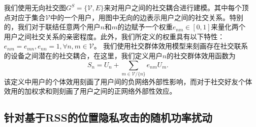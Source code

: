 我们使用无向社交图$G^S=\{\mathcal{V},E\}$来对用户之间的社交耦合进行建模。其中每个顶点对应于集合$\mathcal{V}$中的一个用户，用图中无向的边表示用户之间的社交关系。特别的，我们对于联结任意两个用户$n$和$m$的边赋予一个权重$e_{nm}\in [0,1]$来量化两个用户之间社交关系的亲密程度。此外，我们所定义的权重具有以下特性：$e_{nm}=e_{mn},e_{nn}=1, \forall n,m\in\mathcal{V}$。
我们使用社交群体效用模型来刻画存在社交联系的设备之间潜在的社交耦合，在这里，我们定义用户$n$的社交群体效用函数为
\vspace{-0.2cm}
\begin{equation}\label{sgu}
S_n=U_n+\sum_{m\in \mathcal{V}/\{n\}}e_{nm}U_m.
\end{equation}
该定义中用户的个体效用刻画了用户间的{\kaishu 负网络外部性}影响，而对于社交好友个体效用的加权求和则刻画了用户之间的{\kaishu 正网络外部性}效应。


\subsection{针对基于RSS的位置隐私攻击的随机功率扰动}\label{sec:privacy-model}
